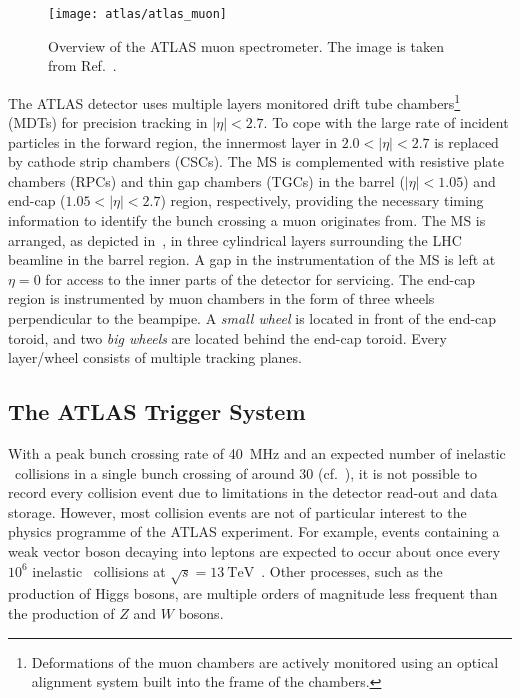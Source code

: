 \begin{figure}[htbp]
  \centering

  \texttt{[image: atlas/atlas\_muon]}

  \caption{Overview of the ATLAS muon spectrometer. The image is taken from
    Ref.~\cite{PERF-2007-01}.}%
  \label{fig:atlas_muon_system}
\end{figure}

The ATLAS detector uses multiple layers monitored drift tube
chambers\footnote{Deformations of the muon chambers are actively monitored using
  an optical alignment system built into the frame of the chambers.} (MDTs) for
precision tracking in $|\eta| < 2.7$. To cope with the large rate of incident
particles in the forward region, the innermost layer in $2.0 < |\eta| < 2.7$ is
replaced by cathode strip chambers (CSCs). The MS is complemented with resistive
plate chambers (RPCs) and thin gap chambers (TGCs) in the barrel
($|\eta| < 1.05$) and end-cap ($1.05 < |\eta| < 2.7$) region, respectively,
providing the necessary timing information to identify the bunch crossing a muon
originates from. The MS is arranged, as depicted
in~, in three cylindrical layers surrounding the LHC
beamline in the barrel region. A gap in the instrumentation of the MS is left at
$\eta = 0$ for access to the inner parts of the detector for servicing. The
end-cap region is instrumented by muon chambers in the form of three wheels
perpendicular to the beampipe. A \emph{small wheel} is located in front of the
end-cap toroid, and two \emph{big wheels} are located behind the end-cap
toroid. Every layer/wheel consists of multiple tracking planes.


\subsection{The ATLAS Trigger System}%
\label{sec:atlas_trigger}

With a peak bunch crossing rate of \SI{40}{\mega\hertz} and an expected number
of inelastic \pp~collisions in a single bunch crossing of around \num{30} (cf.\
), it is not possible to record every collision event due
to limitations in the detector read-out and data storage. However, most
collision events are not of particular interest to the physics programme of the
ATLAS experiment. For example, events containing a weak vector boson decaying
into leptons are expected to occur about once every $10^6$ inelastic
\pp~collisions at $\sqrt{s} = \SI{13}{\TeV}$~\cite{STDM-2015-03}. Other
processes, such as the production of Higgs bosons, are multiple orders of
magnitude less frequent than the production of $Z$ and $W$ bosons.

